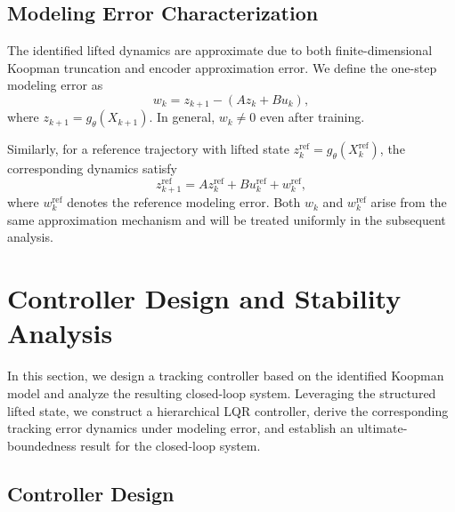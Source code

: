\documentclass[journal]{IEEEtran}
\begin{document}
\subsection{Modeling Error Characterization}
\label{subsec:modeling_error}

The identified lifted dynamics are approximate due to both finite-dimensional Koopman truncation and encoder approximation error. We define the one-step modeling error as
\begin{equation}
    w_k = z_{k+1} - (A z_k + B u_k),
    \label{eq:modeling_error}
\end{equation}
where $z_{k+1} = g_\theta(X_{k+1})$. In general, $w_k \neq 0$ even after training.

Similarly, for a reference trajectory with lifted state $z_k^{\mathrm{ref}} = g_\theta(X_k^{\mathrm{ref}})$, the corresponding dynamics satisfy
\begin{equation}
    z_{k+1}^{\mathrm{ref}} = A z_k^{\mathrm{ref}} + B u_k^{\mathrm{ref}} + w_k^{\mathrm{ref}},
    \label{eq:ref_error}
\end{equation}
where $w_k^{\mathrm{ref}}$ denotes the reference modeling error. Both $w_k$ and $w_k^{\mathrm{ref}}$ arise from the same approximation mechanism and will be treated uniformly in the subsequent analysis.




\section{Controller Design and Stability Analysis}
\label{sec:control}

In this section, we design a tracking controller based on the identified Koopman model and analyze the resulting closed-loop system. Leveraging the structured lifted state, we construct a hierarchical LQR controller, derive the corresponding tracking error dynamics under modeling error, and establish an ultimate-boundedness result for the closed-loop system.

\subsection{Controller Design}
\label{subsec:controller_design}
\end{document}
